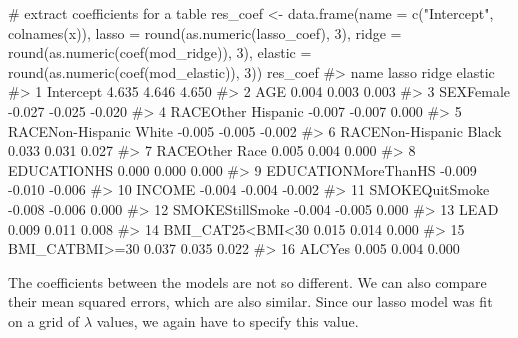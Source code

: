 \documentclass[
  letterpaper,
]{latex/krantz}
\makeatletter
\newenvironment{Shaded}{\begin{snugshade}}{\end{snugshade}}
\newcommand{\AttributeTok}[1]{\textcolor[rgb]{0.40,0.45,0.13}{#1}}
\newcommand{\CommentTok}[1]{\textcolor[rgb]{0.37,0.37,0.37}{#1}}
\newcommand{\DecValTok}[1]{\textcolor[rgb]{0.68,0.00,0.00}{#1}}
\newcommand{\FunctionTok}[1]{\textcolor[rgb]{0.28,0.35,0.67}{#1}}
\newcommand{\NormalTok}[1]{\textcolor[rgb]{0.00,0.23,0.31}{#1}}
\newcommand{\OtherTok}[1]{\textcolor[rgb]{0.00,0.23,0.31}{#1}}
\newcommand{\StringTok}[1]{\textcolor[rgb]{0.13,0.47,0.30}{#1}}
\newenvironment{kframe}{%
\medskip{}
\setlength{\fboxsep}{.8em}
 \def\at@end@of@kframe{}%
 \ifinner\ifhmode%
  \def\at@end@of@kframe{\end{minipage}}%
  \begin{minipage}{\columnwidth}%
 \fi\fi%
 \def\FrameCommand##1{\hskip\@totalleftmargin \hskip-\fboxsep
 \colorbox{shadecolor}{##1}\hskip-\fboxsep
     \hskip-\linewidth \hskip-\@totalleftmargin \hskip\columnwidth}%
 \MakeFramed {\advance\hsize-\width
   \@totalleftmargin\z@ \linewidth\hsize
   \@setminipage}}%
 {\par\unskip\endMakeFramed%
 \at@end@of@kframe}
\renewenvironment{Shaded}{\begin{kframe}}{\end{kframe}}
\makeatother
\begin{document}
\begin{Shaded}
\begin{Highlighting}[]
\CommentTok{\# extract coefficients for a table}
\NormalTok{res\_coef }\OtherTok{\textless{}{-}} \FunctionTok{data.frame}\NormalTok{(}\AttributeTok{name =} \FunctionTok{c}\NormalTok{(}\StringTok{"Intercept"}\NormalTok{, }\FunctionTok{colnames}\NormalTok{(x)),}
                       \AttributeTok{lasso =} \FunctionTok{round}\NormalTok{(}\FunctionTok{as.numeric}\NormalTok{(lasso\_coef), }\DecValTok{3}\NormalTok{),}
                       \AttributeTok{ridge =} \FunctionTok{round}\NormalTok{(}\FunctionTok{as.numeric}\NormalTok{(}\FunctionTok{coef}\NormalTok{(mod\_ridge)), }\DecValTok{3}\NormalTok{),}
                       \AttributeTok{elastic =} \FunctionTok{round}\NormalTok{(}\FunctionTok{as.numeric}\NormalTok{(}\FunctionTok{coef}\NormalTok{(mod\_elastic)), }
                                       \DecValTok{3}\NormalTok{))}
\NormalTok{res\_coef}
\CommentTok{\#\textgreater{}                      name  lasso  ridge elastic}
\CommentTok{\#\textgreater{} 1               Intercept  4.635  4.646   4.650}
\CommentTok{\#\textgreater{} 2                     AGE  0.004  0.003   0.003}
\CommentTok{\#\textgreater{} 3               SEXFemale {-}0.027 {-}0.025  {-}0.020}
\CommentTok{\#\textgreater{} 4      RACEOther Hispanic {-}0.007 {-}0.007   0.000}
\CommentTok{\#\textgreater{} 5  RACENon{-}Hispanic White {-}0.005 {-}0.005  {-}0.002}
\CommentTok{\#\textgreater{} 6  RACENon{-}Hispanic Black  0.033  0.031   0.027}
\CommentTok{\#\textgreater{} 7          RACEOther Race  0.005  0.004   0.000}
\CommentTok{\#\textgreater{} 8             EDUCATIONHS  0.000  0.000   0.000}
\CommentTok{\#\textgreater{} 9     EDUCATIONMoreThanHS {-}0.009 {-}0.010  {-}0.006}
\CommentTok{\#\textgreater{} 10                 INCOME {-}0.004 {-}0.004  {-}0.002}
\CommentTok{\#\textgreater{} 11         SMOKEQuitSmoke {-}0.008 {-}0.006   0.000}
\CommentTok{\#\textgreater{} 12        SMOKEStillSmoke {-}0.004 {-}0.005   0.000}
\CommentTok{\#\textgreater{} 13                   LEAD  0.009  0.011   0.008}
\CommentTok{\#\textgreater{} 14       BMI\_CAT25\textless{}BMI\textless{}30  0.015  0.014   0.000}
\CommentTok{\#\textgreater{} 15         BMI\_CATBMI\textgreater{}=30  0.037  0.035   0.022}
\CommentTok{\#\textgreater{} 16                 ALCYes  0.005  0.004   0.000}
\end{Highlighting}
\end{Shaded}

The coefficients between the models are not so different. We can also
compare their mean squared errors, which are also similar. Since our
lasso model was fit on a grid of \(\lambda\) values, we again have to
specify this value.
\end{document}

